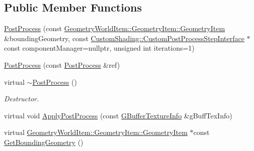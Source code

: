 \subsection*{Public Member Functions}
\begin{DoxyCompactItemize}
\item 
\mbox{\hyperlink{class_geometry_engine_1_1_geometry_post_process_1_1_post_process_a8ac111eed6abc9c97e32fa609f0b2cc4}{Post\+Process}} (const \mbox{\hyperlink{class_geometry_engine_1_1_geometry_world_item_1_1_geometry_item_1_1_geometry_item}{Geometry\+World\+Item\+::\+Geometry\+Item\+::\+Geometry\+Item}} \&bounding\+Geometry, const \mbox{\hyperlink{class_geometry_engine_1_1_custom_shading_1_1_custom_post_process_step_interface}{Custom\+Shading\+::\+Custom\+Post\+Process\+Step\+Interface}} $\ast$const component\+Manager=nullptr, unsigned int iterations=1)
\item 
\mbox{\hyperlink{class_geometry_engine_1_1_geometry_post_process_1_1_post_process_af5599c4257746130644eb6beb421a25a}{Post\+Process}} (const \mbox{\hyperlink{class_geometry_engine_1_1_geometry_post_process_1_1_post_process}{Post\+Process}} \&ref)
\item 
\mbox{\label{class_geometry_engine_1_1_geometry_post_process_1_1_post_process_ae50dbe0c834a713d1f3163f9706b2e91}} 
virtual \mbox{\hyperlink{class_geometry_engine_1_1_geometry_post_process_1_1_post_process_ae50dbe0c834a713d1f3163f9706b2e91}{$\sim$\+Post\+Process}} ()
\begin{DoxyCompactList}\small\item\em Destructor. \end{DoxyCompactList}\item 
virtual void \mbox{\hyperlink{class_geometry_engine_1_1_geometry_post_process_1_1_post_process_a2dbb157265ebdeea658982673e757d46}{Apply\+Post\+Process}} (const \mbox{\hyperlink{class_geometry_engine_1_1_g_buffer_texture_info}{G\+Buffer\+Texture\+Info}} \&g\+Buff\+Tex\+Info)
\item 
\mbox{\label{class_geometry_engine_1_1_geometry_post_process_1_1_post_process_ac6330351811b87a8e701402e2d04d415}} 
virtual \mbox{\hyperlink{class_geometry_engine_1_1_geometry_world_item_1_1_geometry_item_1_1_geometry_item}{Geometry\+World\+Item\+::\+Geometry\+Item\+::\+Geometry\+Item}} $\ast$const \mbox{\hyperlink{class_geometry_engine_1_1_geometry_post_process_1_1_post_process_ac6330351811b87a8e701402e2d04d415}{Get\+Bounding\+Geometry}} ()

\end{DoxyCompactItemize}
